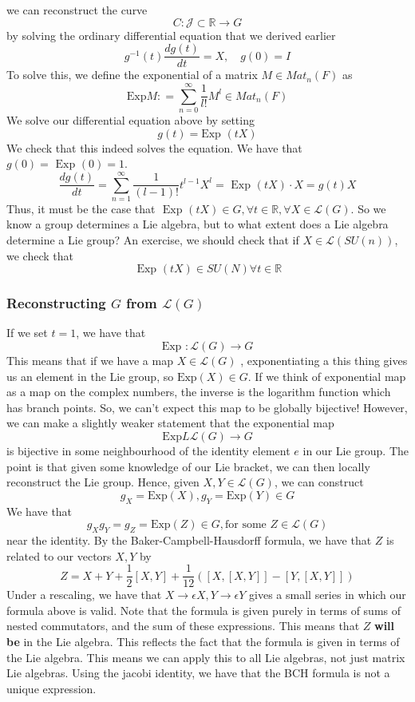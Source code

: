 we can reconstruct the curve 
\[
	C : \mathcal{ J } \subset \mathbb{ R} \rightarrow G 
\] by solving the ordinary differential equation that we derived earlier
\[
	g ^{ -1 } ( t) \frac{ d g( t) }{ dt } =  X, \quad g ( 0 ) = I  
\]  To solve this, we define the exponential of a matrix 
$ M \in Mat_ n ( F) $ as 
\[
	\text{Exp} M : = \sum_{n=0}^{\infty} \frac{1}{l ! } M ^ l \in Mat_n ( F) 
\] 
We solve our differential equation above by 
setting 
\[
	g ( t) = \text{Exp } ( tX) 
\] We check that this indeed solves the equation. 
We have that $ g ( 0 ) = \text{ Exp } ( 0 ) = 1$. 
\[
	\frac{dg ( t) }{ dt }  =  \sum_{n=1}^{\infty} \frac{1}{( l - 1 ) ! } t ^{ l - 1} X^ l = \text{ Exp } ( tX) \cdot X = g ( t) X 
\] Thus, it must be the case that 
$ \text{ Exp } ( tX ) \in G, \forall t \in \mathbb{ R} , \forall X \in \mathcal{ L } ( G )$. 
So we know a group determines a Lie algebra, but 
to what extent does a Lie algebra determine a Lie group? 
An exercise, we should check that 
if $ X \in \mathcal{ L } ( SU ( n ) ) $, we check that 
\[
	\text{ Exp } ( t X ) \in SU ( N ) \forall t \in \mathbb{ R} 	
\] 

\subsubsection{Reconstructing $ G $ from  $ \mathcal{ L } ( G ) $} 
If we set $ t = 1$, 
we have that 
 \[
	 \text{Exp } : \mathcal{ L  }( G ) \to G 
\]
This means that if we have a map $ X \in \mathcal{ L } ( G ) $ , 
exponentiating a this thing gives us an element in the Lie group, so $ \text{Exp} ( X) \in G $. 
If we think of exponential map as a map on the complex numbers, 
the inverse is the logarithm function which has branch points. 
So, we can't expect this map to be globally bijective! 
However, we can make a slightly weaker statement that the exponential map 
\[
	\text{Exp} L \mathcal{ L } ( G ) \to G 
\]  is bijective in some neighbourhood of the 
identity element $ e $ in our Lie group. 
The point is that given some knowledge of our Lie bracket, 
we can then locally reconstruct the Lie group. 
Hence, given $ X, Y \in \mathcal{ L } ( G)  $, we can 
construct 
\[
	g_{ X }  = \text{Exp} ( X) , g_Y  = \text{Exp} (Y) \in G 
\] We have that 
\[
	g_X g_Y  = g_Z = \text{Exp} ( Z ) \in G, \text{for some } Z \in \mathcal{L }(G ) 	 
\] near the identity. 
By the Baker-Campbell-Hausdorff formula, 
we have that $ Z $ is related to our vectors $ X, Y $ by 
\[
	Z = X + Y + \frac{1}{2 } [ X, Y ] + \frac{1}{12 } \left( [ X, [ X, Y ] ] - [ Y , [ X, Y ] ]  \right) 
\] Under a rescaling, we have that 
$ X \to \epsilon  X , Y \to \epsilon Y $  gives a small series in which 
our formula above is valid. 
Note that the formula is given purely in terms of sums of nested commutators, 
and the sum of these expressions. This means that $ Z $ \textbf{will be } in the 
Lie algebra. 
This reflects the fact that the formula is given in terms of the Lie algebra. 
This means we can apply this to all Lie algebras, 
not just matrix Lie algebras. 
Using the jacobi identity, we have that the BCH formula is 
not a unique expression. 


